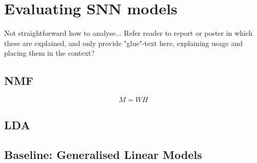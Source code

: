\documentclass[mphil,deptreport,ai]{infthesis} %
\begin{document}




\section{Evaluating SNN models}

Not straightforward how to analyse... 
Refer reader to report or poster in which these are explained, and only provide "glue"-text here, explaining usage and placing them in the context?

\subsection{NMF}

\begin{equation}
	M = WH
\end{equation}

\subsection{LDA}



\subsection{Baseline: Generalised Linear Models}
\end{document}
